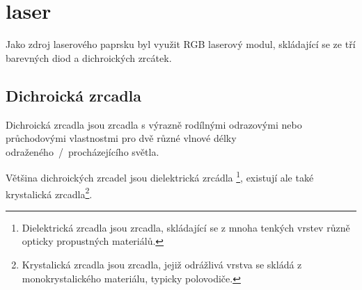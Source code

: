 \section{laser}
Jako zdroj laserového paprsku byl využit RGB laserový modul, skládající se ze tří barevných diod a dichroických zrcátek.

\subsection{Dichroická zrcadla~\cite{dichronic-mirrors}}


Dichroická zrcadla jsou zrcadla s výrazně rodílnými odrazovými nebo průchodovými vlastnostmi pro dvě různé vlnové délky odraženého~/~procházejícího světla.

Většina dichroických zrcadel jsou dielektrická zrcádla \footnote{Dielektrická zrcadla jsou zrcadla, skládající se z mnoha tenkých vrstev různě opticky propustných materiálů.}, existují ale také krystalická zrcadla\footnote{Krystalická zrcadla jsou zrcadla, jejiž odrážlivá vrstva se skládá z monokrystalického materiálu, typicky polovodiče.}.

